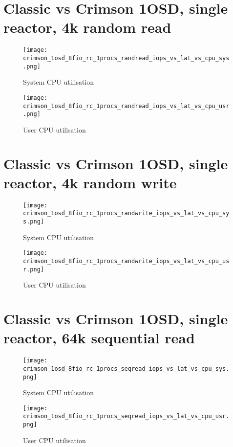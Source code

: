 \documentclass[]{report}
\begin{document}


\chapter{Classic vs Crimson 1OSD, single reactor, 4k random read}
\begin{figure}[ht]
  \centering
  \texttt{[image: crimson\_1osd\_8fio\_rc\_1procs\_randread\_iops\_vs\_lat\_vs\_cpu\_sys.png]}
\caption{System CPU utilisation}
\end{figure}

\begin{figure}[h]
  \centering
  \texttt{[image: crimson\_1osd\_8fio\_rc\_1procs\_randread\_iops\_vs\_lat\_vs\_cpu\_usr.png]}
\caption{User CPU utilisation}
\end{figure}

%    
\chapter{Classic vs Crimson 1OSD, single reactor, 4k random write}
\begin{figure}[ht]
  \centering
  \texttt{[image: crimson\_1osd\_8fio\_rc\_1procs\_randwrite\_iops\_vs\_lat\_vs\_cpu\_sys.png]}
\caption{System CPU utilisation}
\end{figure}

\begin{figure}[h]
  \centering
  \texttt{[image: crimson\_1osd\_8fio\_rc\_1procs\_randwrite\_iops\_vs\_lat\_vs\_cpu\_usr.png]}
\caption{User CPU utilisation}
\end{figure}

\chapter{Classic vs Crimson 1OSD, single reactor, 64k sequential read}
\begin{figure}[h]
  \centering
  \texttt{[image: crimson\_1osd\_8fio\_rc\_1procs\_seqread\_iops\_vs\_lat\_vs\_cpu\_sys.png]}
\caption{System CPU utilisation}
\end{figure}

\begin{figure}[ht]
  \centering
  \texttt{[image: crimson\_1osd\_8fio\_rc\_1procs\_seqread\_iops\_vs\_lat\_vs\_cpu\_usr.png]}
\caption{User CPU utilisation}
\end{figure}
\end{document}
